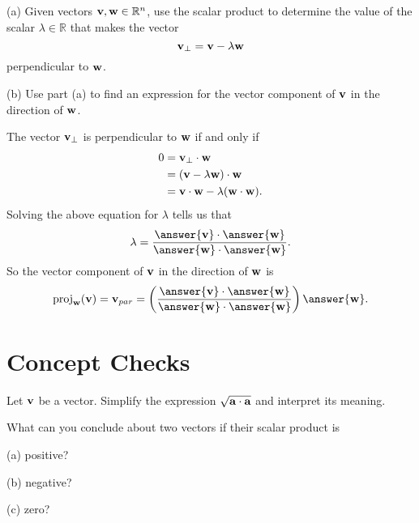 \documentclass{ximera}
\begin{document}
\begin{question}   \label{Qrasd5r:Scalar}
(a) Given vectors ${\bf v}, {\bf w} \in \mathbb{R}^n$, use the scalar product to determine the value of the scalar $\lambda\in \mathbb{R}$ that makes the vector
\[
     {\bf v}_{\perp} = {\bf v} - \lambda {\bf w}
\]
perpendicular to ${\bf w}$.

(b) Use part (a) to find an expression for the vector component of ${\bf v}$ in the direction of ${\bf w}$.

\begin{explanation}
The vector ${\bf v}_{\perp}$ is perpendicular to ${\bf w}$ if and only if
\begin{align*}
     0        &=   \textbf{v}_{\perp} \cdot \textbf{w}   \\ 
               &= \left( {\bf v} - \lambda {\bf w} \right) \cdot {\bf w} \\
               &= {\bf v}\cdot {\bf w} - \lambda ({\bf w}\cdot {\bf w}) .
\end{align*}
Solving the above equation for $\lambda$ tells us that
\[
    \lambda = \frac{\answer{{\bf v}}\cdot \answer{{\bf w}}}{\answer{{\bf w}}\cdot \answer{{\bf w}}} .
\]
So the vector component of ${\bf v}$ in the direction of ${\bf w}$ is
\[
    \text{proj}_{{\bf w}}({\bf v}) = {\bf v}_{par} = \left(  \frac{\answer{{\bf v}}\cdot \answer{{\bf w}}}{\answer{{\bf w}}\cdot \answer{{\bf w}}}    \right) \answer{\bf w}.
\]
\end{explanation}
\end{question}


\section{Concept Checks}

\begin{question} \label{Q9343525r32}
Let ${\bf v}$ be a vector. Simplify the expression $\sqrt{{\bf a}\cdot {\bf a}}$ and interpret its meaning.
\end{question}

\begin{question}  \label{Qer034234234}
What can you conclude about two vectors if their scalar product is 

(a) positive?

(b) negative?

(c) zero?
\end{question}
\end{document}
